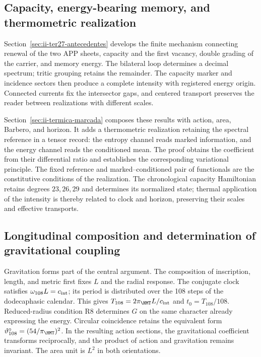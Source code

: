 \subsection{Capacity, energy-bearing memory, and thermometric realization}

Section~\ref{sec:ii-ter27-antecedentes} develops the finite mechanism
connecting renewal of the two APP sheets, capacity and the first vacancy,
double grading of the carrier, and memory energy. The bilateral loop
determines a decimal spectrum; tritic grouping retains the remainder.
The capacity marker and incidence sectors then produce a complete
intensity with registered energy origin. Connected currents fix the
intersector gaps, and centered transport preserves the reader between
realizations with different scales.

Section~\ref{sec:ii-termica-marcada} composes these results with action,
area, Barbero, and horizon. It adds a thermometric realization retaining
the spectral reference in a tensor record: the entropy channel reads
marked information, and the energy channel reads the conditioned mean.
The proof obtains the coefficient from their differential ratio and
establishes the corresponding variational principle. The fixed reference
and marked--conditioned pair of functionals are the constitutive conditions
of the realization. The chronological capacity Hamiltonian retains degrees
$23,26,29$ and determines its normalized state; thermal application of the
intensity is thereby related to clock and horizon, preserving their scales
and effective transports.

\subsection{Longitudinal composition and determination of gravitational coupling}

Gravitation forms part of the central argument. The composition of
inscription, length, and metric first fixes \(L\) and the radial response.
The conjugate clock satisfies \(\omega_{108}L=c_{\rm int}\); its period
is distributed over the 108 steps of the dodecaphasic calendar. This gives
\(T_{108}=2\pi_{\HMT}L/c_{\rm int}\) and \(t_0=T_{108}/108\).
Reduced-radius condition R8 determines \(G\) on the same character
already expressing the energy. Circular coincidence retains the equivalent
form \(\vartheta_{108}^{\circ}=(54/\pi_{\HMT})^2\). In the resulting
action sections, the gravitational coefficient transforms reciprocally,
and the product of action and gravitation remains invariant. The area
unit is \(L^2\) in both orientations.

